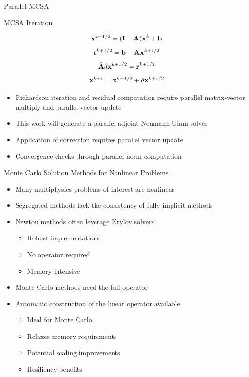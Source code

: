 \documentclass{beamer}
\begin{document}
\begin{frame}{Parallel MCSA}

  \begin{beamerboxesrounded}[upper=boxheadcolor,lower=boxbodycolor,shadow=true]
    {MCSA Iteration}

    \[
    \mathbf{x}^{k+1/2} = (\mathbf{I} - \mathbf{A})\mathbf{x}^k + \mathbf{b}
    \]
    \[
    \mathbf{r}^{k+1/2} = \mathbf{b} - \mathbf{A}\mathbf{x}^{k+1/2}
    \]
    \[
    \hat{\mathbf{A}}\delta\mathbf{x}^{k+1/2} = \mathbf{r}^{k+1/2}
    \]
    \[
    \mathbf{x}^{k+1} = \mathbf{x}^{k+1/2} + \delta \mathbf{x}^{k+1/2}
    \]

  \end{beamerboxesrounded}

  \begin{itemize}
  \item Richardson iteration and residual computation require parallel
    matrix-vector multiply and parallel vector update
  \item This work will generate a parallel adjoint Neumann-Ulam solver
  \item Application of correction requires parallel vector update
  \item Convergence checks through parallel norm computation
  \end{itemize}

\end{frame}

\begin{frame}{Monte Carlo Solution Methods for Nonlinear Problems}

  \pause
  \begin{itemize}
  \item Many multiphysics problems of interest are nonlinear
  \item Segregated methods lack the consistency of fully implicit
    methods
  \item Newton methods often leverage Krylov solvers
    \begin{itemize}
    \item Robust implementations
    \item No operator required
    \item Memory intensive
    \end{itemize}
  \item Monte Carlo methods need the full operator
  \item Automatic construction of the linear operator available
    \begin{itemize}
    \item Ideal for Monte Carlo
    \item Relaxes memory requirements
    \item Potential scaling improvements
    \item Resiliency benefits
    \end{itemize}
  \end{itemize}

\end{frame}
\end{document}
